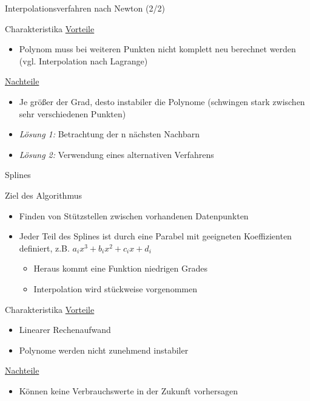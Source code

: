 \begin{frame}{Interpolationsverfahren nach Newton (2/2)}
\begin{block} {Charakteristika}
\underline{Vorteile}
\begin{itemize}
\item Polynom muss bei weiteren Punkten nicht komplett neu berechnet werden (vgl. Interpolation nach Lagrange)
\end{itemize}
\underline{Nachteile}
\begin{itemize}
\item Je größer der Grad, desto instabiler die Polynome (schwingen stark zwischen sehr verschiedenen Punkten)
\item \textit{Lösung 1:} Betrachtung der n nächsten Nachbarn
\item \textit{Lösung 2:} Verwendung eines alternativen Verfahrens
\end{itemize}
\end{block}
\end{frame}

\begin{frame}{Splines}
\begin{block}{Ziel des Algorithmus}
\begin{itemize}
\item Finden von Stützstellen zwischen vorhandenen Datenpunkten
\item Jeder Teil des Splines ist durch eine Parabel mit geeigneten Koeffizienten definiert, z.B. $a_{i}x^3 + b_{i}x^2 + c_{i}x + d_{i}$
\begin{itemize}
\item Heraus kommt eine Funktion niedrigen Grades
\item Interpolation wird stückweise vorgenommen
\end{itemize}
\end{itemize}
\end{block}
\begin{block} {Charakteristika}
\underline{Vorteile}
\begin{itemize}
\item Linearer Rechenaufwand
\item Polynome werden nicht zunehmend instabiler
\end{itemize}
\underline{Nachteile}
\begin{itemize}
\item Können keine Verbrauchswerte in der Zukunft vorhersagen
\end{itemize}
\end{block}
\end{frame}

